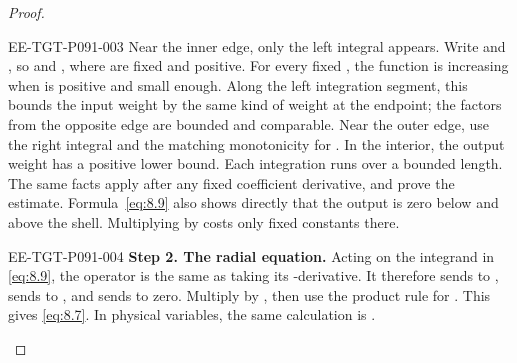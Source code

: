 \begin{proof}
\begin{EESegment}{EE-TGT-P091-003}
Near the inner edge, only the left integral appears. Write
 and , so
 and
, where
 are fixed and positive. For every fixed
, the function
 is increasing when
 is positive and small enough. Along the left integration segment, this
bounds the input weight by the same kind of weight at the endpoint; the factors from the opposite
edge are bounded and comparable. Near the outer edge, use the right integral and the matching
monotonicity for . In the interior, the output weight has a positive lower
bound. Each integration runs over a bounded length. The same facts apply after any fixed coefficient
derivative, and prove the  estimate. Formula~\eqref{eq:8.9}
also shows directly that the output is zero below and above the shell. Multiplying by
 costs only fixed constants there.
\end{EESegment}

\begin{EESegment}{EE-TGT-P091-004}
\noindent\textbf{Step 2. The radial equation.} Acting on the integrand in \eqref{eq:8.9}, the
operator  is the same as taking its
-derivative. It therefore sends
 to , sends
 to , and sends
 to zero. Multiply by
, then use the product rule for
. This gives \eqref{eq:8.7}. In physical variables, the same
calculation is .
\end{EESegment}


\end{proof}
